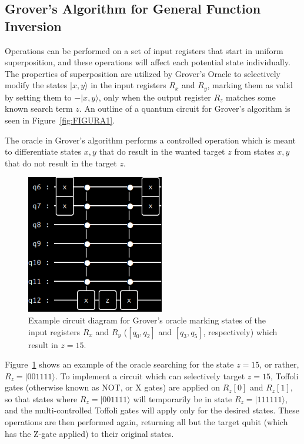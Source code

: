\documentclass[twocolumn]{cinc}
\begin{document}
  \subsection{Grover's Algorithm for General Function Inversion} 

  Operations can be performed on a set of input registers that start in uniform 
  superposition, and these operations will affect each potential state individually. 
  The properties of superposition are utilized by Grover's Oracle to selectively 
  modify the states $|x,y\rangle$ in the input registers $R_x$ and $R_y$,
  marking them as valid by setting them to $-|x,y\rangle$, only when the output register
  $R_z$ matches some known search term $z$. An outline of a quantum circuit for
  Grover's algorithm is seen in Figure~\ref{fig:FIGURA1}.

  The oracle in Grover's algorithm performs a controlled operation which is meant
  to differentiate states $x,y$ that do result in the wanted target $z$ from 
  states $x,y$ that do not result in the target $z$.
  
  \begin{figure}[h]\label{fig:FIGURA2}
  \centering
  \includegraphics[width=6.0cm]{oracle_15.png}
  \caption{Example circuit diagram for Grover's oracle marking states of the input
  registers $R_x$ and $R_y$ ($[q_0,q_2]$ and $[q_3,q_5]$, respectively) which
  result in $z=15$.}
  \end{figure}

  Figure~\ref{fig:FIGURA2} shows an example of the oracle searching for the state $z=15$,
  or rather, $R_z=|001111\rangle$. To implement a circuit which can selectively target
  $z=15$, Toffoli gates (otherwise known as NOT, or X gates) are applied on 
  $R_z[0]$ and $R_z[1]$, so that states where $R_z=|001111\rangle$ will temporarily be in
  state $R_z=|111111\rangle$, and the multi-controlled Toffoli gates\cite{multi_toffoli}
  will apply only for the desired states. These operations are then performed again,
  returning all but the target qubit (which has the Z-gate applied) to their original
  states.
\end{document}
